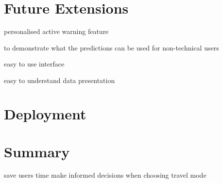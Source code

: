\subsection{}

\section{Future Extensions}
\par personalised active warning feature

\par to demonstrate what the predictions can be used for non-technical users

\par easy to use interface
\par easy to understand data presentation

\section{Deployment}

\section{Summary}
save users time
make informed decisions when choosing travel mode
